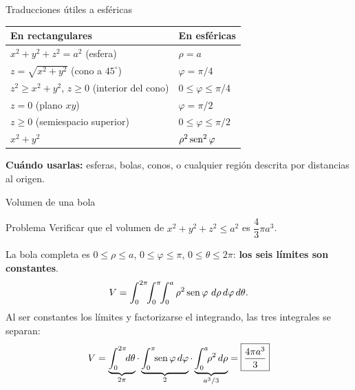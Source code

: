 \documentclass[11pt,aspectratio=169]{beamer}
\begin{document}
\begin{frame}{Traducciones útiles a esféricas}
  \begin{center}
  \renewcommand{\arraystretch}{1.5}
  \small
  \begin{tabular}{ll}
    \toprule
    \textbf{En rectangulares} & \textbf{En esféricas}\\
    \midrule
    $x^2+y^2+z^2=a^2$ (esfera) & $\rho=a$\\
    $z=\sqrt{x^2+y^2}$ (cono a $45^\circ$) & $\varphi=\pi/4$\\
    $z^2\ge x^2+y^2$, $z\ge0$ (interior del cono) & $0\le\varphi\le\pi/4$\\
    $z=0$ (plano $xy$) & $\varphi=\pi/2$\\
    $z\ge0$ (semiespacio superior) & $0\le\varphi\le\pi/2$\\
    $x^2+y^2$ & $\rho^2\operatorname{sen}^2\varphi$\\
    \bottomrule
  \end{tabular}
  \end{center}
  \vspace{8pt}
  \pause
  \begin{center}
  \normalsize\color{tealx} \textbf{Cuándo usarlas:} esferas, bolas, conos, o cualquier región descrita por distancias al origen.
  \end{center}
\end{frame}

\begin{frame}{Volumen de una bola}
  \begin{block}{Problema}
    Verificar que el volumen de $x^2+y^2+z^2\le a^2$ es $\dfrac43\pi a^3$.
  \end{block}
  \pause
  La bola completa es $0\le\rho\le a$, $0\le\varphi\le\pi$, $0\le\theta\le2\pi$: \textbf{los seis límites son constantes}.
  \pause
  \[
    V=\int_0^{2\pi}\!\!\int_0^{\pi}\!\!\int_0^{a}\rho^2\sen\varphi\ d\rho\,d\varphi\,d\theta.
  \]
  \pause
  Al ser constantes los límites y factorizarse el integrando, las tres integrales se separan:
  \[
    V=\underbrace{\int_0^{2\pi}\!\!d\theta}_{2\pi}\cdot
      \underbrace{\int_0^{\pi}\!\!\operatorname{sen}\varphi\,d\varphi}_{2}\cdot
      \underbrace{\int_0^{a}\!\!\rho^2\,d\rho}_{a^3/3}
    = \boxed{\frac{4\pi a^3}{3}}
  \]
\end{frame}
\end{document}
